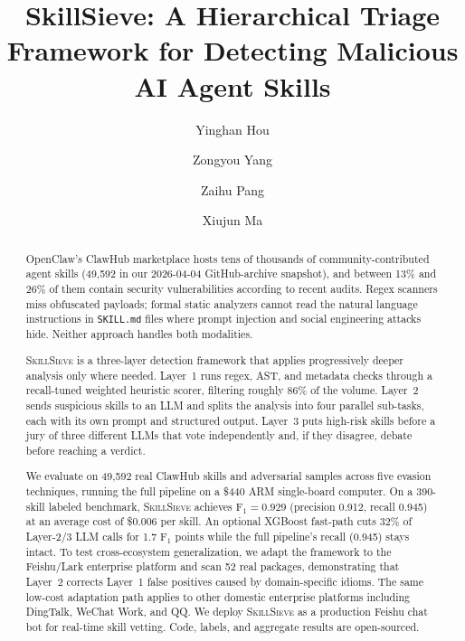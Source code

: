 \documentclass[sigconf,nonacm]{acmart}
\begin{document}
\title{SkillSieve: A Hierarchical Triage Framework for Detecting Malicious AI Agent Skills}

\author{Yinghan Hou}

\author{Zongyou Yang}
\authornotemark[1]

\author{Zaihu Pang}

\author{Xiujun Ma}

\begin{abstract}
OpenClaw's ClawHub marketplace hosts tens of thousands of community-contributed agent skills (49,592 in our 2026-04-04 GitHub-archive snapshot), and between 13\% and 26\% of them contain security vulnerabilities according to recent audits. Regex scanners miss obfuscated payloads; formal static analyzers cannot read the natural language instructions in \texttt{SKILL.md} files where prompt injection and social engineering attacks hide. Neither approach handles both modalities.

\textsc{SkillSieve} is a three-layer detection framework that applies progressively deeper analysis only where needed. Layer~1 runs regex, AST, and metadata checks through a recall-tuned weighted heuristic scorer, filtering roughly 86\% of the volume. Layer~2 sends suspicious skills to an LLM and splits the analysis into four parallel sub-tasks, each with its own prompt and structured output. Layer~3 puts high-risk skills before a jury of three different LLMs that vote independently and, if they disagree, debate before reaching a verdict.

We evaluate on 49,592 real ClawHub skills and adversarial samples across five evasion techniques, running the full pipeline on a \$440 ARM single-board computer. On a 390-skill labeled benchmark, \textsc{SkillSieve} achieves F$_1=0.929$ (precision 0.912, recall 0.945) at an average cost of \$0.006 per skill. An optional XGBoost fast-path cuts 32\% of Layer-2/3 LLM calls for 1.7 F$_1$ points while the full pipeline's recall (0.945) stays intact. To test cross-ecosystem generalization, we adapt the framework to the Feishu/Lark enterprise platform and scan 52 real packages, demonstrating that Layer~2 corrects Layer~1 false positives caused by domain-specific idioms. The same low-cost adaptation path applies to other domestic enterprise platforms including DingTalk, WeChat Work, and QQ. We deploy \textsc{SkillSieve} as a production Feishu chat bot for real-time skill vetting. Code, labels, and aggregate results are open-sourced.
\end{abstract}
\end{document}

